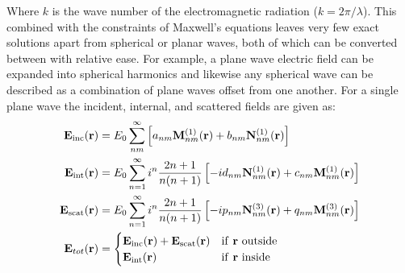 Where $k$ is the wave number of the electromagnetic radiation 
($k = 2\pi/\lambda$). This combined with the constraints of 
Maxwell's equations leaves very few exact solutions apart from 
spherical or planar waves, both of which can be converted between 
with relative ease. For example, a plane wave electric field can 
be expanded into spherical harmonics and likewise any spherical 
wave can be described as a combination of plane waves offset from 
one another. For a single plane wave the incident, internal, and 
scattered fields are given as: 
\begin{align}
	\label{eq:incident}
	{\bf E}_{\rm inc}({\bf r})
	&=
    E_0 \sum_{nm}^\infty \left[
    a_{nm}{\bf M}_{nm}^{(1)}({\bf r})
    + b_{nm}{\bf N}_{nm}^{(1)}({\bf r})\right]
  \\
  \label{eq:internal}
  {\bf E}_{\rm int}({\bf r})
  &=
    E_0 \sum_{n=1}^\infty i^n\frac{2n+1}{n(n+1)}\left[
    -id_{nm}{\bf N}_{nm}^{(1)}({\bf r}) + c_{nm}{\bf M}_{nm}^{(1)}({\bf r})
    \right]
  \\
  \label{eq:scattered}
  {\bf E}_{\rm scat}({\bf r})
  &=
    E_0 \sum_{n=1}^\infty  i^n\frac{2n+1}{n(n+1)}\left[
      -i p_{nm}{\bf N}_{nm}^{(3)}({\bf r})+q_{nm}{\bf M}_{nm}^{(3)}({\bf r})
    \right] 
    \\
	\mathbf{E}_{tot}({\bf r}) &= 
	\begin{cases}
		{\bf E}_{\rm inc}({\bf r}) + {\bf E}_{\rm scat}({\bf r}) & \text{if \textbf{r} outside}
		\\ 
		{\bf E}_{\rm int}({\bf r}) & \text{if \textbf{r} inside}
	\end{cases}
\end{align}

